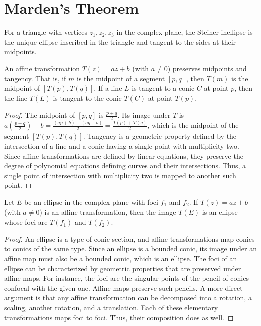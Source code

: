 \chapter{Marden's Theorem}

\begin{definition}
    \label{def:Steiner_Inellipse}
    For a triangle with vertices $z_1, z_2, z_3$ in the complex plane, the Steiner inellipse is the unique ellipse inscribed in the triangle and tangent to the sides at their midpoints.
\end{definition}

\begin{lemma}
    \label{lem:Affine_Geometric_Preservation}
    An affine transformation $T(z) = az+b$ (with $a \neq 0$) preserves midpoints and tangency. That is, if $m$ is the midpoint of a segment $[p,q]$, then $T(m)$ is the midpoint of $[T(p), T(q)]$. If a line $L$ is tangent to a conic $C$ at point $p$, then the line $T(L)$ is tangent to the conic $T(C)$ at point $T(p)$.
\end{lemma}
\begin{proof}
    The midpoint of $[p,q]$ is $\frac{p+q}{2}$. Its image under $T$ is $a(\frac{p+q}{2}) + b = \frac{(ap+b)+(aq+b)}{2} = \frac{T(p)+T(q)}{2}$, which is the midpoint of the segment $[T(p), T(q)]$.
    Tangency is a geometric property defined by the intersection of a line and a conic having a single point with multiplicity two. Since affine transformations are defined by linear equations, they preserve the degree of polynomial equations defining curves and their intersections. Thus, a single point of intersection with multiplicity two is mapped to another such point.
\end{proof}

\begin{lemma}
    \label{lem:Ellipse_Foci_Covariance}
    Let $E$ be an ellipse in the complex plane with foci $f_1$ and $f_2$. If $T(z) = az+b$ (with $a \neq 0$) is an affine transformation, then the image $T(E)$ is an ellipse whose foci are $T(f_1)$ and $T(f_2)$.
\end{lemma}
\begin{proof}
    An ellipse is a type of conic section, and affine transformations map conics to conics of the same type. Since an ellipse is a bounded conic, its image under an affine map must also be a bounded conic, which is an ellipse.
    The foci of an ellipse can be characterized by geometric properties that are preserved under affine maps. For instance, the foci are the singular points of the pencil of conics confocal with the given one. Affine maps preserve such pencils. A more direct argument is that any affine transformation can be decomposed into a rotation, a scaling, another rotation, and a translation. Each of these elementary transformations maps foci to foci. Thus, their composition does as well.
\end{proof}

